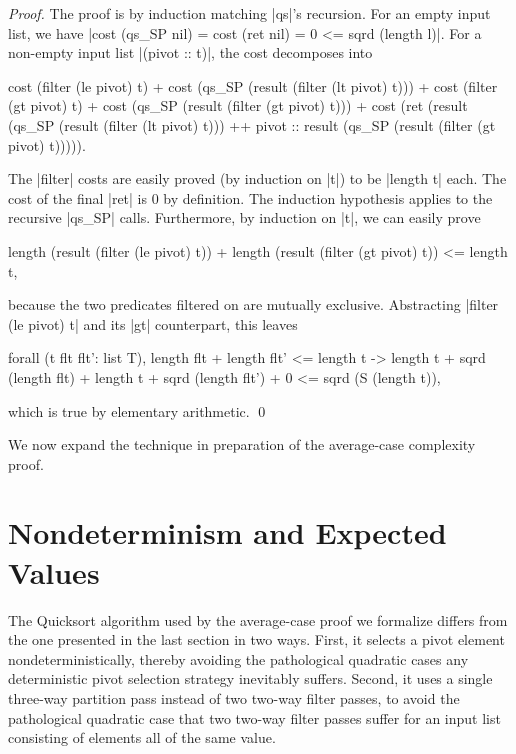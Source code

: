 \documentclass[runningheads]{llncs}
\begin{document}
\begin{proof}
  The proof is by induction matching |qs|'s recursion. For an empty input list, we have |cost (qs_SP nil) = cost (ret nil) = 0 <= sqrd (length l)|. For a non-empty input list |(pivot :: t)|, the cost decomposes into
  \begin{code}
    cost (filter (le pivot) t) + cost (qs_SP (result (filter (lt pivot) t))) +
    cost (filter (gt pivot) t) + cost (qs_SP (result (filter (gt pivot) t))) +
    cost (ret (result (qs_SP (result (filter (lt pivot) t))) ++
     pivot :: result (qs_SP (result (filter (gt pivot) t))))).
  \end{code}
  The |filter| costs are easily proved (by induction on |t|) to be |length t| each. The cost of the final |ret| is 0 by definition. The induction hypothesis applies to the recursive |qs_SP| calls. Furthermore, by induction on |t|, we can easily prove
  \begin{code}
  length (result (filter (le pivot) t)) +
  length (result (filter (gt pivot) t)) <= length t,
  \end{code}
  because the two predicates filtered on are mutually exclusive. Abstracting |filter (le pivot) t| and its |gt| counterpart, this leaves
  \begin{code}
    forall (t flt flt': list T), length flt + length flt' <= length t ->
      length t + sqrd (length flt) + length t + sqrd (length flt') + 0 <= sqrd (S (length t)),
  \end{code}
  which is true by elementary arithmetic. \qed
\end{proof}

We now expand the technique in preparation of the average-case complexity proof.

\section{Nondeterminism and Expected Values}
\label{nondetexpec}

The Quicksort algorithm used by the average-case proof we formalize differs from the one presented in the last section in two ways. First, it selects a pivot element nondeterministically, thereby avoiding the pathological quadratic cases any deterministic pivot selection strategy inevitably suffers. Second, it uses a single three-way partition pass instead of two two-way filter passes, to avoid the pathological quadratic case that two two-way filter passes suffer for an input list consisting of elements all of the same value.
\end{document}
